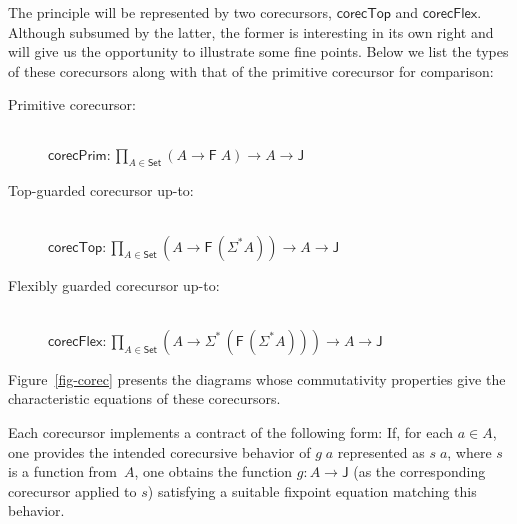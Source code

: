 \documentclass[preprint,draft]
{sigplanconf}
\newcommand\TC{\mathsf}
\newcommand{\ra}{\rightarrow}
\newcommand{\<}{\langle}
\renewcommand{\>}{\rangle}
\newcommand{\corec}{{{\mathsf{corecPrim}}}}
\newcommand\corecU{\mathsf{corecTop}}
\newcommand\corecUU{\mathsf{corecFlex}}
\newcommand{\F}{{\TC{F}}}
\newcommand{\J}{{\TC{J}}}
\renewcommand{\SS}{{\TC{\Sigma}}}
\newcommand\Set{\TC{Set}}
\begin{document}
The principle will be represented by two corecursors, $\corecU$ and $\corecUU$. Although
subsumed by the latter, the former is interesting in its own right and will
give us the opportunity to illustrate some fine points. Below
we list the types of these corecursors
along with that of the primitive corecursor for comparison:
\begin{description}
\item[Primitive corecursor:]
\ \\\hspace*{3ex}
$\corec : \prod_{A \in \Set} (A \ra \F\;A) \ra A \ra \J$
\item[Top-guarded corecursor up-to:]
\ \\\hspace*{3ex}
$\corecU : \prod_{A \in \Set} (A \ra \F\,(\SS^*A)) \ra A \ra \J$
\item[Flexibly guarded corecursor up-to:]
\ \\\hspace*{3ex}
$\corecUU : \prod_{A \in \Set} (A \ra \SS^*\,(\F\,(\SS^*A))) \ra A \ra \J$
\end{description}
Figure~\ref{fig-corec} presents the diagrams whose commutativity properties give
the characteristic equations of these corecursors.

Each corecursor implements a contract of the following form:
If, for each $a \in A$, one provides the intended corecursive behavior of $g\;a$ represented as $s\;a$,
where $s$ is a function
from~$A$,
one obtains the function $g : A \ra \J$ (as the corresponding corecursor applied to $s$) satisfying a suitable fixpoint equation matching this behavior.
\end{document}
